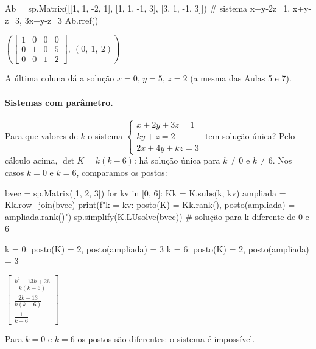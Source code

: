 \begin{entrada}
Ab = sp.Matrix([[1, 1, -2, 1],
                [1, 1, -1, 3],
                [3, 1, -1, 3]])       # sistema x+y-2z=1, x+y-z=3, 3x+y-z=3
Ab.rref()
\end{entrada}
\begin{saidamat}
$\displaystyle \left( \left[\begin{matrix}1 & 0 & 0 & 0\\0 & 1 & 0 & 5\\0 & 0 & 1 & 2\end{matrix}\right], \  \left( 0, \  1, \  2\right)\right)$
\end{saidamat}

A última coluna dá a solução $x=0$, $y=5$, $z=2$ (a mesma das Aulas 5 e 7).

\paragraph{Sistemas com parâmetro.} Para que valores de $k$ o sistema
$\begin{cases}x+2y+3z=1\\ ky+z=2\\ 2x+4y+kz=3\end{cases}$ tem solução única? Pelo cálculo acima, $\det K=k(k-6)$:
há solução única para $k\neq0$ e $k\neq6$. Nos casos $k=0$ e $k=6$, comparamos os postos:

\begin{entrada}
bvec = sp.Matrix([1, 2, 3])
for kv in [0, 6]:
    Kk = K.subs(k, kv)
    ampliada = Kk.row_join(bvec)
    print(f"k = {kv}: posto(K) = {Kk.rank()}, posto(ampliada) = {ampliada.rank()}")
sp.simplify(K.LUsolve(bvec))           # solução para k diferente de 0 e 6
\end{entrada}
\begin{saida}
k = 0: posto(K) = 2, posto(ampliada) = 3
k = 6: posto(K) = 2, posto(ampliada) = 3
\end{saida}
\begin{saidamat}
$\displaystyle \left[\begin{matrix}\frac{k^{2} - 13 k + 26}{k \left(k - 6\right)}\\\frac{2 k - 13}{k \left(k - 6\right)}\\\frac{1}{k - 6}\end{matrix}\right]$
\end{saidamat}

Para $k=0$ e $k=6$ os postos são diferentes: o sistema é impossível.

